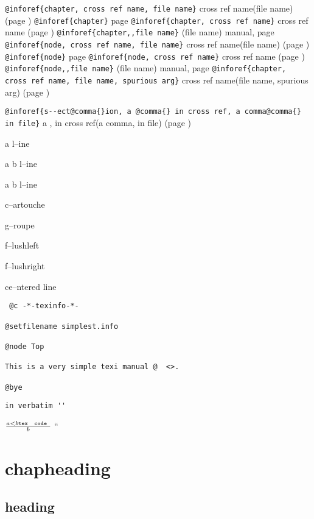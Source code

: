 \documentclass{book}
\begin{document}
\texttt{@inforef\{chapter, cross ref name, file name\}} cross ref name(file name) (page \pageref{anchor:chapter})
\texttt{@inforef\{chapter\}} page \pageref{anchor:chapter}
\texttt{@inforef\{chapter, cross ref name\}} cross ref name (page \pageref{anchor:chapter})
\texttt{@inforef\{chapter,,file name\}} (file name) manual, page \pageref{anchor:chapter}
\texttt{@inforef\{node, cross ref name, file name\}} cross ref name(file name) (page \pageref{anchor:node})
\texttt{@inforef\{node\}} page \pageref{anchor:node}
\texttt{@inforef\{node, cross ref name\}} cross ref name (page \pageref{anchor:node})
\texttt{@inforef\{node,,file name\}} (file name) manual, page \pageref{anchor:node}
\texttt{@inforef\{chapter, cross ref name, file name, spurious arg\}} cross ref name(file name, spurious arg) (page \pageref{anchor:chapter})

\texttt{@inforef\{s{-}{-}ect@comma\{\}ion, a @comma\{\} in cross
ref, a comma@comma\{\} in file\}}
a , in cross
ref(a comma, in file) (page \pageref{anchor:s_002d_002dect_002cion})


a
l--ine

a
b
l--ine

a
b
l--ine

c--artouche

g--roupe

f--lushleft

f--lushright

ce--ntered line

\begin{verbatim}
 @c -*-texinfo-*-

@setfilename simplest.info

@node Top

This is a very simple texi manual @  <>.

@bye
\end{verbatim}

\begin{verbatim}
in verbatim ''
\end{verbatim}





$\frac{a < b \texttt{tex \hbox{ code }}}{b}$ ``


\chapter*{chapheading}

\section*{heading}
\end{document}
